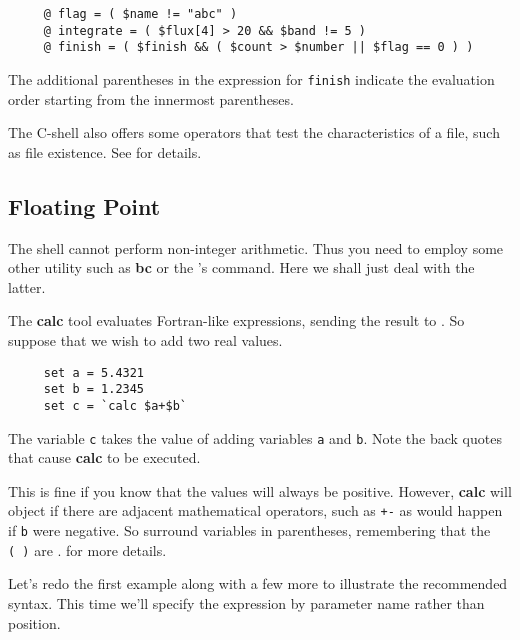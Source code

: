 \small
\begin{verbatim}
     @ flag = ( $name != "abc" )
     @ integrate = ( $flux[4] > 20 && $band != 5 )
     @ finish = ( $finish && ( $count > $number || $flag == 0 ) )
\end{verbatim}
\normalsize

The additional parentheses in the expression for {\tt finish} indicate
the evaluation order starting from the innermost parentheses.

The C-shell also offers some operators that test the characteristics
of a file, such as file existence.  See
 for details.

\newpage
\subsection{Floating Point\label{sc4_se_real}}

The shell cannot perform non-integer arithmetic.  Thus you need to
employ some other utility such as {\bf bc} or the {\KAPPAref}'s
 command.  Here we shall just deal with the latter.

The {\bf calc} tool evaluates Fortran-like expressions, sending the
result to .  So suppose
that we wish to add two real values.

\small
\begin{verbatim}
     set a = 5.4321
     set b = 1.2345
     set c = `calc $a+$b`
\end{verbatim}
\normalsize
The variable {\tt c} takes the value of adding variables {\tt a} and
{\tt b}.  Note the back quotes that cause {\bf calc} to be executed.

This is fine if you know that the values will always be positive.
However, {\bf calc} will object if there are adjacent mathematical
operators, such as {\tt +-} as would happen if {\tt b} were negative.
So surround variables in parentheses, remembering that the {\tt (~)} are
. 
 for more details.

Let's redo the first example along with a few more to illustrate the
recommended syntax.  This time we'll specify the expression by parameter
name rather than position.

